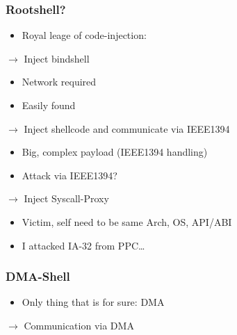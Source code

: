 \documentclass{beamer}
\newenvironment{itemizeframe}[1]
  {\begin{frame}{#1}\startitemizeframe}
  {\stopitemizeframe\end{frame}}
\newcommand\startitemizeframe{\begin{itemize}}
\newcommand\stopitemizeframe{\end{itemize}}
\begin{document}
		\begin{frame} \frametitle{Rootshell?}
			\begin{itemize}
				\item Royal leage of code-injection: 
			\end{itemize}
			$\rightarrow$ Inject bindshell
			\begin{itemize}
				\item Network required
				\item Easily found
			\end{itemize}
			$\rightarrow$ Inject shellcode and communicate via IEEE1394
			\begin{itemize}
				\item Big, complex payload (IEEE1394 handling)
				\item Attack via IEEE1394?
			\end{itemize}
			$\rightarrow$ Inject Syscall-Proxy
			\begin{itemize}
				\item Victim, self need to be same Arch, OS, API/ABI
				\item I attacked IA-32 from PPC\ldots
			\end{itemize}
		\end{frame}

		\begin{frame} \frametitle{DMA-Shell}
			\begin{itemize}
				\item Only thing that is for sure: DMA
			\end{itemize}
			$\rightarrow$ Communication via DMA
		\end{frame}
		
\end{document}
